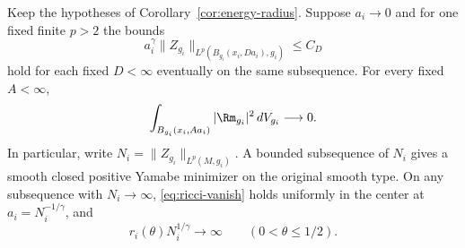 \begin{theorem}\label{thm:ricci-scale}
Keep the hypotheses of Corollary~\ref{cor:energy-radius}. Suppose
\(a_i\to0\) and for one fixed finite \(p>2\) the bounds
\[
  a_i^\gamma\|Z_{g_i}\|_{L^p(B_{g_i}(x_i,D a_i),g_i)}
       \le C_D
\]
hold for each fixed \(D<\infty\) eventually on the same subsequence.
For every fixed \(A<\infty\),
\begin{equation}\label{eq:ricci-vanish}
 \int_{B_{g_i}(x_i,A a_i)}|\Rm_{g_i}|^2\,dV_{g_i}\longrightarrow0 .
\end{equation}
In particular, write \(N_i=\|Z_{g_i}\|_{L^p(M,g_i)}\). A bounded
subsequence of \(N_i\) gives a smooth closed positive Yamabe
minimizer on the original smooth type. On any subsequence with
\(N_i\to\infty\), \eqref{eq:ricci-vanish} holds uniformly in the
center at \(a_i=N_i^{-1/\gamma}\), and
\[
              r_i(\theta)N_i^{1/\gamma}\longrightarrow\infty
              \qquad(0<\theta\le1/2).
\]
\end{theorem}

